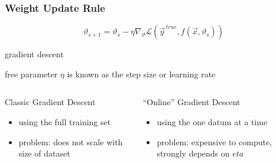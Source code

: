 \documentclass[
  aspectratio=1610, %
  intlimits %
]{beamer}
\begin{document}
 \begin{frame}
 \frametitle{Weight Update Rule}

 \begin{equation*}
\vartheta_{s+1} = \vartheta_{s} - \eta \nabla_{\vartheta}\mathcal{L}( \vec{y}^{\,true}, f(\vec{x}, \vartheta_{s}))
\end{equation*}

\begin{exampleblock}{gradient descent}
  \begin{center}
    free parameter $\eta$ is known as the step size or learning rate
  \end{center}
\end{exampleblock}

\begin{columns}
  \begin{column}{.45\textwidth}
    \begin{alertblock}{Classic Gradient Descent}
    \begin{itemize}
    \item using the full training set
    \item problem: does not scale with size of dataset
    \end{itemize}
  \end{alertblock}
\end{column}

\begin{column}{.45\textwidth}
  
  \begin{alertblock}{``Online'' Gradient Descent}
    \begin{itemize}
    \item using the one datum at a time
    \item problem: expensive to compute, strongly depends on $eta$
    \end{itemize}
  \end{alertblock}
    
  \end{column}
\end{columns}

\end{frame}
\end{document}
